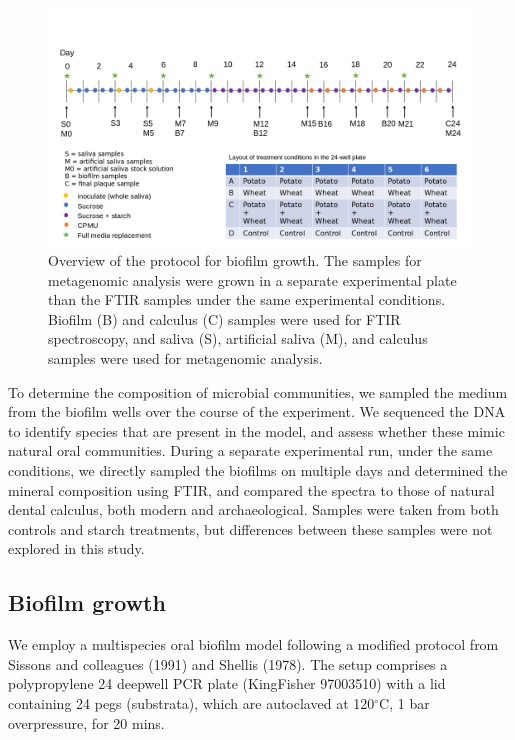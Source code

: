 \documentclass[
]{article}
\begin{document}
\begin{figure}

{\centering \includegraphics{figures/Exp_protocol.png}

}

\caption{\label{fig-protocol}Overview of the protocol for biofilm
growth. The samples for metagenomic analysis were grown in a separate
experimental plate than the FTIR samples under the same experimental
conditions. Biofilm (B) and calculus (C) samples were used for FTIR
spectroscopy, and saliva (S), artificial saliva (M), and calculus
samples were used for metagenomic analysis.}

\end{figure}

To determine the composition of microbial communities, we sampled the
medium from the biofilm wells over the course of the experiment. We
sequenced the DNA to identify species that are present in the model, and
assess whether these mimic natural oral communities. During a separate
experimental run, under the same conditions, we directly sampled the
biofilms on multiple days and determined the mineral composition using
FTIR, and compared the spectra to those of natural dental calculus, both
modern and archaeological. Samples were taken from both controls and
starch treatments, but differences between these samples were not
explored in this study.

\hypertarget{biofilm-growth}{%
\subsection{Biofilm growth}\label{biofilm-growth}}

We employ a multispecies oral biofilm model following a modified
protocol from Sissons and colleagues (1991) and Shellis (1978). The
setup comprises a polypropylene 24 deepwell PCR plate (KingFisher
97003510) with a lid containing 24 pegs (substrata), which are
autoclaved at 120\(^{\circ}\)C, 1 bar overpressure, for 20 mins.
\end{document}
